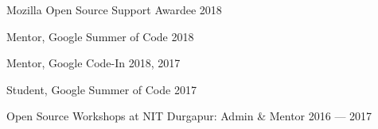 Mozilla Open Source Support Awardee \hfill 2018

Mentor, Google Summer of Code \hfill 2018

Mentor, Google Code-In \hfill 2018, 2017

Student, Google Summer of Code \hfill 2017

Open Source Workshops at NIT Durgapur: Admin \& Mentor \hfill 2016 --- 2017
